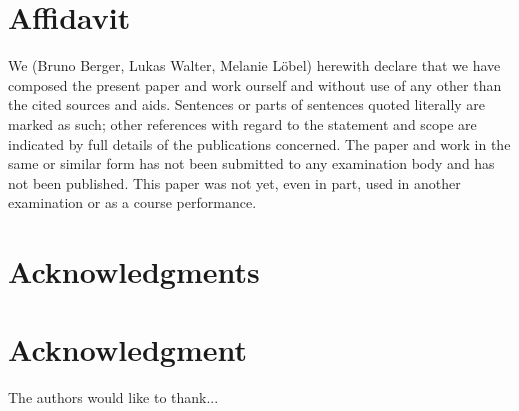 \documentclass[conference,compsoc]{IEEEtran}
\begin{document}


%
\IEEEpeerreviewmaketitle








\section{Affidavit}
We (Bruno Berger, Lukas Walter, Melanie Löbel) herewith declare that we have composed the present paper and work ourself and without use of any other than the cited sources and aids. Sentences or parts of sentences quoted literally are marked as such; other references with regard to the statement and scope are indicated by full details of the publications concerned. The paper and work in the same or similar form has not been submitted to any examination body and has not been published. This paper was not yet, even in part, used in another examination or as a course performance.


\ifCLASSOPTIONcompsoc
  \section*{Acknowledgments}
\else
  \section*{Acknowledgment}
\fi


The authors would like to thank...







\printbibliography


\end{document}
